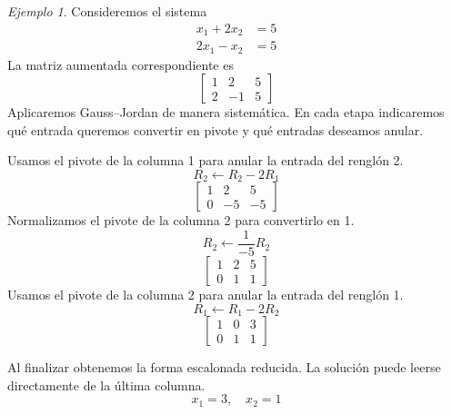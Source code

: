 \documentclass[12pt]{article}
\theoremstyle{remark}
\newtheorem{Ejem}[definicion]{Ejemplo}
\begin{document}
\begin{Ejem}
Consideremos el sistema
\[
\begin{aligned}
x_{1} + 2 x_{2} &= 5\\
2 x_{1} - x_{2} &= 5
\end{aligned}
\]
La matriz aumentada correspondiente es
\[
\left[\begin{array}{cc|c}
1 & 2 & 5\\
2 & -1 & 5
\end{array}\right]
\]
Aplicaremos Gauss--Jordan de manera sistemática. En cada etapa indicaremos qué entrada queremos convertir en pivote y qué entradas deseamos anular.


Usamos el pivote de la columna 1 para anular la entrada del renglón 2.
\[
R_{2}\leftarrow R_{2}-2R_{1}
\]
\[
\left[\begin{array}{cc|c}
1 & 2 & 5\\
0 & -5 & -5
\end{array}\right]
\]
Normalizamos el pivote de la columna 2 para convertirlo en 1.
\[
R_{2}\leftarrow \frac{1}{-5}R_{2}
\]
\[
\left[\begin{array}{cc|c}
1 & 2 & 5\\
0 & 1 & 1
\end{array}\right]
\]
Usamos el pivote de la columna 2 para anular la entrada del renglón 1.
\[
R_{1}\leftarrow R_{1}-2R_{2}
\]
\[
\left[\begin{array}{cc|c}
1 & 0 & 3\\
0 & 1 & 1
\end{array}\right]
\]



Al finalizar obtenemos la forma escalonada reducida. La solución puede leerse directamente de la última columna.
\[
\boxed{x_{1}=3,\quad x_{2}=1}
\]
\end{Ejem}
\end{document}
